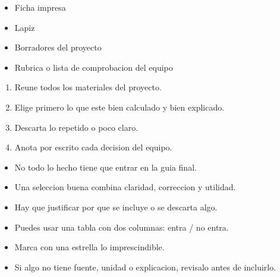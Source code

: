 \documentclass[12pt,a4paper]{article}
\begin{document}
        \FichaCabecera

        \begin{materialesbox}
        \begin{itemize}
    \item Ficha impresa
    \item Lapiz
    \item Borradores del proyecto
    \item Rubrica o lista de comprobacion del equipo
\end{itemize}
        \end{materialesbox}

        \begin{pasosbox}
        \begin{enumerate}
    \item Reune todos los materiales del proyecto.
    \item Elige primero lo que este bien calculado y bien explicado.
    \item Descarta lo repetido o poco claro.
    \item Anota por escrito cada decision del equipo.
\end{enumerate}
        \end{pasosbox}

        \begin{recordatoriobox}
        \begin{itemize}
    \item No todo lo hecho tiene que entrar en la guia final.
    \item Una seleccion buena combina claridad, correccion y utilidad.
    \item Hay que justificar por que se incluye o se descarta algo.
\end{itemize}
        \end{recordatoriobox}

        \begin{apoyobox}
        \begin{itemize}
    \item Puedes usar una tabla con dos columnas: entra / no entra.
    \item Marca con una estrella lo imprescindible.
    \item Si algo no tiene fuente, unidad o explicacion, revisalo antes de incluirlo.
\end{itemize}
        \end{apoyobox}

\end{document}
